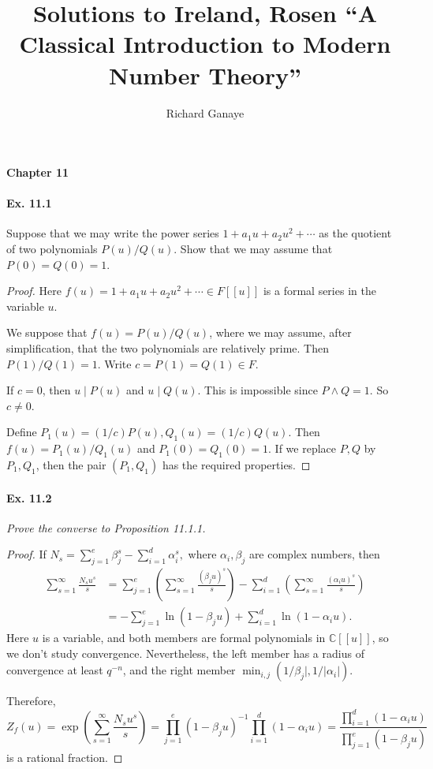 \documentclass[11pt,a4paper]{article}
\title{Solutions to Ireland, Rosen ``A Classical Introduction to Modern Number Theory''}
\author{Richard Ganaye}
\newcommand{\C}{\mathbb{C}}
\begin{document}
{ \Large \bf Chapter 11} 

\paragraph{Ex. 11.1} Suppose that we may write the power series $1+a_1u +a_2u^2+\cdots$ as the quotient of two polynomials $P(u)/Q(u)$. Show that we may assume that $P(0) = Q(0) = 1$.
{\it 

}
\begin{proof}
Here $f(u) = 1+a_1u +a_2u^2+\cdots \in F[[u]]$ is a formal series in the variable $u$.

We suppose that $f(u) = P(u)/Q(u)$, where we may assume, after simplification, that the two polynomials are relatively prime. Then $P(1)/Q(1) =1$. Write $c = P(1) = Q(1) \in F$.

If $c = 0$, then $u\mid P(u)$ and $u \mid Q(u)$. This is impossible since $P \wedge Q = 1$. So $c \ne 0$.

Define $P_1(u) = (1/c) P(u), Q_1(u) = (1/c) Q(u)$. Then $f(u) = P_1(u)/Q_1(u)$ and $P_1(0) = Q_1(0) = 1$. If we replace $P,Q$ by $P_1,Q_1$, then the pair $(P_1,Q_1)$ has the required properties.
\end{proof}

\paragraph{Ex. 11.2}{\it Prove the converse to Proposition 11.1.1.
}

\begin{proof}
If $N_s = \sum_{j=1}^e \beta_j^s - \sum_{i=1}^d \alpha_i^s,$ where $\alpha_i,\beta_j$ are complex numbers,  then
\begin{align*}
\sum_{s=1}^\infty \frac{N_s u^s}{s} &=  \sum_{j=1}^e \left( \sum_{s=1}^\infty \frac{(\beta_j u)^s}{s} \right) - \sum_{i=1}^d \left( \sum_{s=1}^\infty \frac{(\alpha_i u)^s}{s} \right)\\
&=-\sum_{j=1}^e \ln(1 - \beta_ju) + \sum_{i=1}^d \ln(1 - \alpha_i u).
\end{align*}
Here $u$ is a variable, and both members are formal polynomials in $\C[[u]]$, so we don't study convergence. Nevertheless, the left member has a radius of convergence at least $q^{-n}$, and the right member $\min_{i,j}(1/\beta_j|,1/|\alpha_i|)$.

Therefore,
$$Z_f(u) = \exp\left(\sum_{s=1}^\infty \frac{N_s u^s}{s} \right) = \prod_{j=1}^e(1 - \beta_j u)^{-1} \prod_{i=1}^d (1-\alpha_i u) = \frac{\prod_{i=1}^d (1 - \alpha_i u)}{\prod_{j=1}^e (1 - \beta_j u)}$$
is a rational fraction.
\end{proof}
\end{document}

